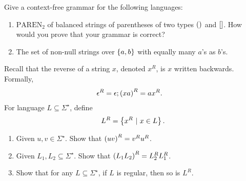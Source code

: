 \documentclass{article}
\begin{document}
\begin{question}
Give a context-free grammar for the following languages:
\begin{enumerate}
 \item $\mbox{PAREN}_2$ of balanced strings of parentheses of two types $\left(  \right)$ and $\left[  \right]$. How would you prove that your grammar is correct?
 \item The set of non-null strings over $\left\{ a,b \right\}$ with equally many $a$'s as $b$'s.
\end{enumerate}
\begin{answer}
\end{answer}
\end{question}
\begin{question}
Recall that the reverse of a string $x$, denoted $x^R$, is $x$ written backwards. Formally,
\begin{eqnarray}
\epsilon^R=\epsilon;&\left( xa \right)^R=ax^R.
\end{eqnarray}
For language $L\subseteq\Sigma^{\star}$, define
\begin{equation}
L^R=\left\{ x^R\ |\ x\in L \right\}.
\end{equation}
\begin{enumerate}
 \item Given $u,v\in\Sigma^{\star}$. Show that $\left( uv \right)^R=v^Ru^R$.
 \item Given $L_1,L_2\subseteq\Sigma^{\star}$. Show that $\left( L_1 L_2 \right)^R=L_2^RL_1^R$.
 \item Show that for any $L\subseteq\Sigma^{\star}$, if $L$ is regular, then so is $L^R$.
\end{enumerate}
\begin{answer}
\end{answer}
\end{question}
\end{document}
